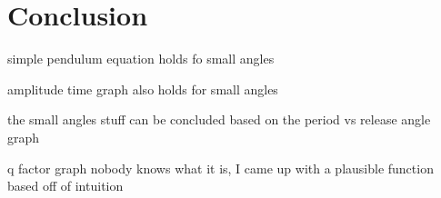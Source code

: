 \documentclass[12pt]{article}
\begin{document}
{\section{Conclusion}
simple pendulum equation holds fo small angles

amplitude time graph also holds for small angles

the small angles stuff can be concluded based on the period vs release angle graph

q factor graph nobody knows what it is, I came up with a plausible function based off of intuition

}

\newpage

\printbibliography
\end{document}
